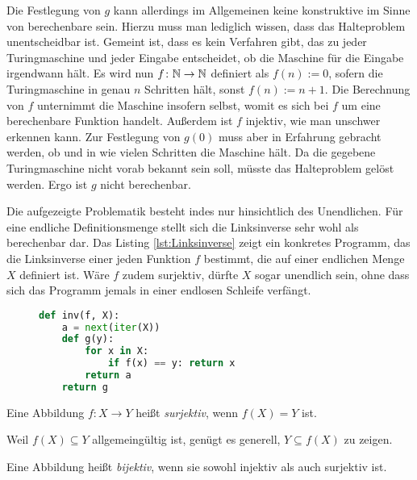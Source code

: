 \noindent
Die Festlegung von $g$ kann allerdings im Allgemeinen keine
konstruktive im Sinne von berechenbare sein. Hierzu muss man lediglich
wissen, dass das Halteproblem unentscheidbar ist. Gemeint ist, dass es kein
Verfahren gibt, das zu jeder Turingmaschine und jeder Eingabe entscheidet,
ob die Maschine für die Eingabe irgendwann hält. Es wird nun
$f\colon\mathbb N\to\mathbb N$ definiert als $f(n):=0$, sofern die Turingmaschine
in genau $n$ Schritten hält, sonst $f(n):=n+1$. Die Berechnung von
$f$ unternimmt die Maschine insofern selbst, womit es sich bei $f$ um eine
berechenbare Funktion handelt. Außerdem ist $f$ injektiv, wie man
unschwer erkennen kann. Zur Festlegung von $g(0)$ muss aber in
Erfahrung gebracht werden, ob und in wie vielen Schritten die Maschine
hält. Da die gegebene Turingmaschine nicht vorab bekannt sein soll, müsste
das Halteproblem gelöst werden. Ergo ist $g$ nicht
berechenbar. \cite{Siraphob}

Die aufgezeigte Problematik besteht indes nur hinsichtlich des
Unendlichen. Für eine endliche Definitionsmenge stellt sich die Linksinverse
sehr wohl als berechenbar dar. Das Listing \ref{lst:Linksinverse} zeigt ein
konkretes Programm, das die Linksinverse einer jeden Funktion $f$
bestimmt, die auf einer endlichen Menge $X$ definiert ist. Wäre $f$
zudem surjektiv, dürfte $X$ sogar unendlich sein, ohne dass sich
das Programm jemals in einer endlosen Schleife verfängt.

\begin{figure}
\begin{lstlisting}[language=Python,%
label=lst:Linksinverse,%
caption={Berechnung einer Linksinverse}]
def inv(f, X):
    a = next(iter(X))
    def g(y):
        for x in X:
            if f(x) == y: return x
        return a
    return g
\end{lstlisting}
\end{figure}

\begin{Definition}[Surjektion]\label{def:surjektiv}\newlinefirst
Eine Abbildung $f\colon X\to Y$ heißt \emph{surjektiv},
wenn $f(X)=Y$ ist.
\end{Definition}

\noindent
Weil $f(X)\subseteq Y$ allgemeingültig ist, genügt es generell,
$Y\subseteq f(X)$ zu zeigen.

\begin{Definition}[Bijektion]\label{def:bijektiv}\newlinefirst
Eine Abbildung heißt \emph{bijektiv}, wenn sie sowohl
injektiv als auch surjektiv ist.
\end{Definition}

